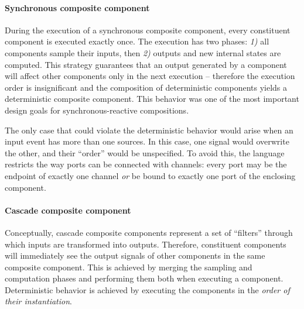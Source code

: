 \paragraph{Synchronous composite component} 
During the execution of a synchronous composite component, every constituent component is executed exactly once. The execution has two phases: \textit{1)} all components sample their inputs, then \textit{2)} outputs and new internal states are computed. This strategy guarantees that an output generated by a component will affect other components only in the next execution -- therefore the execution order is insignificant and the composition of deterministic components yields a deterministic composite component. This behavior was one of the most important design goals for synchronous-reactive compositions.

The only case that could violate the deterministic behavior would arise when an input event has more than one sources. In this case, one signal would overwrite the other, and their ``order'' would be unspecified. To avoid this, the language restricts the way ports can be connected with channels: every port may be the endpoint of exactly one channel \emph{or} be bound to exactly one port of the enclosing component.

\paragraph{Cascade composite component} Conceptually, cascade composite components represent a set of ``filters'' through which inputs are transformed into outputs. Therefore, constituent components will immediately see the output signals of other components in the same composite component. This is achieved by merging the sampling and computation phases and performing them both when executing a component. Deterministic behavior is achieved by executing the components in the \emph{order of their instantiation}.

